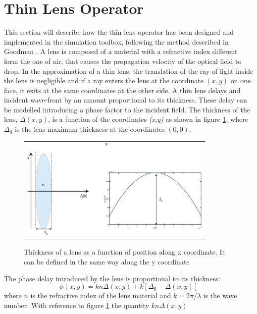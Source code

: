 \section{Thin Lens Operator}
\label{sec:lens}
This section will describe how the thin lens operator has been designed and implemented in the simulation toolbox, following the method described in Goodman \cite{goodman2005introduction}.
A lens is composed of a material with a refractive index different form the one of air, that causes the propagation velocity of the optical field to drop. In the approximation of a thin lens, the translation of the ray of light inside the lens is negligible and if a ray enters the lens at the coordinate $(x,y)$ on one face, it exits at the same coordinates at the other side. A thin lens delays and incident wave-front by an amount proportional to its thickness. These delay can be modelled introducing a phase factor to the incident field. 
The thickness of the lens, $\Delta(x,y)$, is a function of the coordinates \textit{(x,y)} as shown in figure \ref{fig:thick}, where $\Delta_0$ is the lens maximum thickness at the coordinates $(0,0)$.
\begin{figure}[h]
	\begin{center}
		\begin{tabular}{c}
			\includegraphics[height=5cm]{lens1.eps}
		\end{tabular}
	\end{center}
	\caption{ \label{fig:thick} 
	Thickness of a lens as a function of position along x coordinate. It can be defined in the same way along the y coordinate}
\end{figure} 
The phase delay introduced by the lens is proportional to its thickness:
\begin{equation}
\label{eq:phase}
	\phi(x,y)=kn\Delta(x,y)+k[\Delta_0-\Delta(x,y)]
\end{equation} 	
where $n$ is the refractive index of the lens material and $k=2\pi/\lambda$ is the wave number. With reference to figure \ref{fig:thick} the quantity
\begin{math}
	kn\Delta(x,y)
\end{math}
